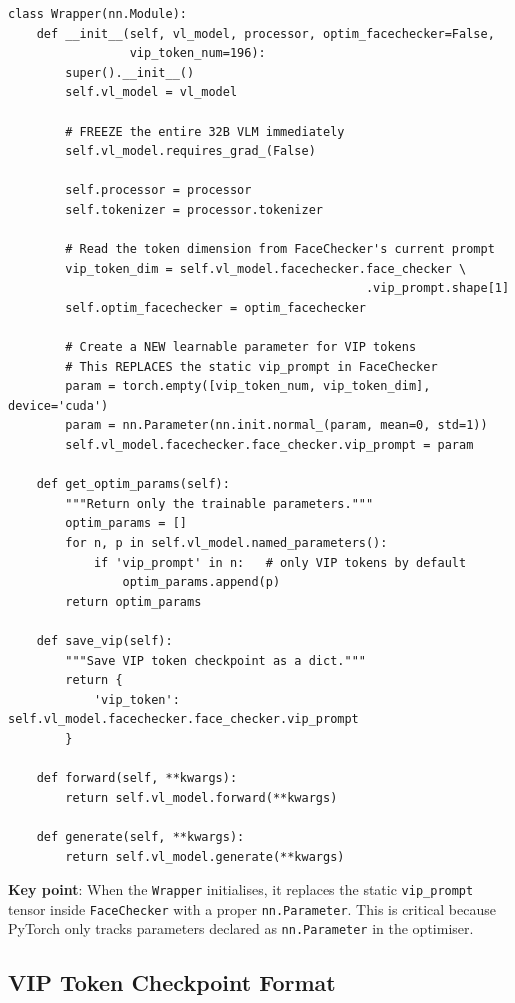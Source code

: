 \documentclass[12pt,a4paper]{article}
\begin{document}
\begin{lstlisting}[caption={Models/Wrapper.py -- Full listing}]
class Wrapper(nn.Module):
    def __init__(self, vl_model, processor, optim_facechecker=False,
                 vip_token_num=196):
        super().__init__()
        self.vl_model = vl_model

        # FREEZE the entire 32B VLM immediately
        self.vl_model.requires_grad_(False)

        self.processor = processor
        self.tokenizer = processor.tokenizer

        # Read the token dimension from FaceChecker's current prompt
        vip_token_dim = self.vl_model.facechecker.face_checker \
                                                  .vip_prompt.shape[1]
        self.optim_facechecker = optim_facechecker

        # Create a NEW learnable parameter for VIP tokens
        # This REPLACES the static vip_prompt in FaceChecker
        param = torch.empty([vip_token_num, vip_token_dim], device='cuda')
        param = nn.Parameter(nn.init.normal_(param, mean=0, std=1))
        self.vl_model.facechecker.face_checker.vip_prompt = param

    def get_optim_params(self):
        """Return only the trainable parameters."""
        optim_params = []
        for n, p in self.vl_model.named_parameters():
            if 'vip_prompt' in n:   # only VIP tokens by default
                optim_params.append(p)
        return optim_params

    def save_vip(self):
        """Save VIP token checkpoint as a dict."""
        return {
            'vip_token': self.vl_model.facechecker.face_checker.vip_prompt
        }

    def forward(self, **kwargs):
        return self.vl_model.forward(**kwargs)

    def generate(self, **kwargs):
        return self.vl_model.generate(**kwargs)
\end{lstlisting}

\textbf{Key point}: When the \texttt{Wrapper} initialises, it replaces the static \texttt{vip\_prompt} tensor inside \texttt{FaceChecker} with a proper \texttt{nn.Parameter}. This is critical because PyTorch only tracks parameters declared as \texttt{nn.Parameter} in the optimiser.

\subsection{VIP Token Checkpoint Format}
\end{document}
